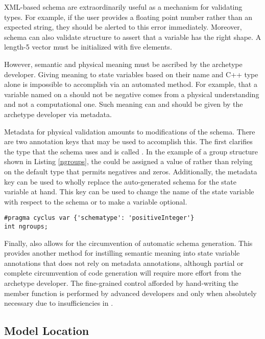 \gls{XML}-based schema are extraordinarily useful as a mechanism for validating types.
For example, if the user provides a floating point number rather than an
expected string, they should be alerted to this error immediately.
Moreover, schema can also validate structure to assert that
a variable has the right shape. A length-5 vector must be initialized with
five elements.

However, semantic and physical meaning must be ascribed by the archetype developer.
Giving meaning to state variables based
on their name and C++ type alone is impossible to accomplish via an automated
method. For example, that a variable named 
on a  should not be negative comes from a physical understanding
and not a computational one. Such meaning can and should be given by the
archetype developer via metadata.

Metadata for physical validation amounts to modifications of the schema. There are
two annotation keys that may be used to accomplish this.  The first clarifies the
type that the schema uses and is called .
In the example of a group structure shown in Listing \ref{ngroups}, the
 could be assigned a value of
 rather than relying on the default  type
that permits negatives and zeros. Additionally, the metadata key 
can be used to wholly replace the auto-generated schema for the state variable at
hand. This key can be used to change the name of the state variable with respect
to the schema or to make a variable optional.

\begin{lstlisting}[caption={Physical Constraint Addition via `schematype'}, label=ngroups]
#pragma cyclus var {'schematype': 'positiveInteger'}
int ngroups;
\end{lstlisting}

Finally, \Cyclus also allows for the circumvention of automatic schema generation. This
provides another method for instilling semantic meaning into state variable annotations
that does not rely on metadata annotations, although
partial or complete circumvention of code generation will require
more effort from the archetype developer. The fine-grained control afforded by
hand-writing the  member function is performed
by advanced developers and only when absolutely necessary due to insufficiencies
in \cycpp.

\subsection{Model Location}

